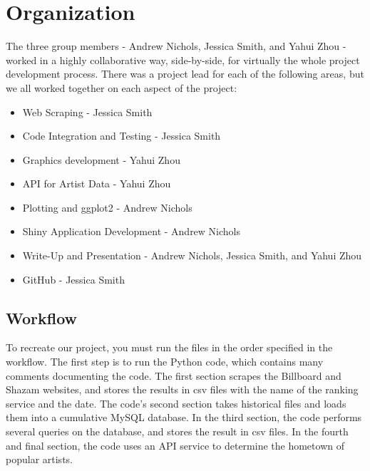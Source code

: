 \documentclass{article}
\begin{document}
\section{Organization}

The three group members - Andrew Nichols, Jessica Smith, and Yahui Zhou - worked in a highly collaborative way, side-by-side, for virtually the whole project development process.  There was a project lead for each of the following areas, but we all worked together on each aspect of the project:


\begin{itemize}
\item Web Scraping - Jessica Smith

\item Code Integration and Testing - Jessica Smith

\item Graphics development - Yahui Zhou

\item API for Artist Data - Yahui Zhou

\item Plotting and ggplot2 - Andrew Nichols

\item Shiny Application Development - Andrew Nichols

\item Write-Up and Presentation - Andrew Nichols, Jessica Smith, and Yahui Zhou

\item GitHub - Jessica Smith
\end{itemize}


\subsection{Workflow}

\noindent
To recreate our project, you must run the files in the order specified in the workflow. The first step is to run the Python code, which contains many comments documenting the code. The first section scrapes the Billboard and Shazam websites, and stores the results in csv files with the name of the ranking service and the date. The code's second section takes historical files and loads them into a cumulative MySQL database. In the third section, the code performs several queries on the database, and stores the result in csv files. In the fourth and final section, the code uses an API service to determine the hometown of popular artists.\vspace{2mm} 
\end{document}
